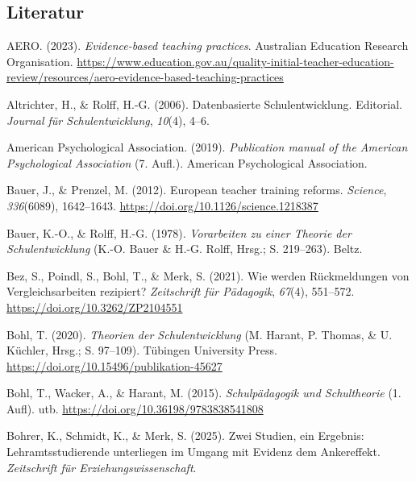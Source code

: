 \documentclass[
  jou,
  floatsintext,
  longtable,
  nolmodern,
  notxfonts,
  notimes,
  colorlinks=true,linkcolor=blue,citecolor=blue,urlcolor=blue]{apa7}
\newlength{\cslhangindent}
\newenvironment{CSLReferences}[2] %
 {\begin{list}{}{%
  \setlength{\itemindent}{0pt}
  \setlength{\leftmargin}{0pt}
  \setlength{\parsep}{0pt}
  \ifodd #1
   \setlength{\leftmargin}{\cslhangindent}
   \setlength{\itemindent}{-1\cslhangindent}
  \fi
  \setlength{\itemsep}{#2\baselineskip}}}
 {\end{list}}
\begin{document}
\subsection{Literatur}\label{literatur}

\label{refs}
\begin{CSLReferences}{1}{0}
AERO. (2023). \emph{Evidence-based teaching practices}. Australian
Education Research Organisation.
\url{https://www.education.gov.au/quality-initial-teacher-education-review/resources/aero-evidence-based-teaching-practices}

Altrichter, H., \& Rolff, H.-G. (2006). Datenbasierte Schulentwicklung.
Editorial. \emph{Journal für Schulentwicklung}, \emph{10}(4), 4--6.

American Psychological Association. (2019). \emph{Publication manual of
the American Psychological Association} (7. Aufl.). American
Psychological Association.

Bauer, J., \& Prenzel, M. (2012). European teacher training reforms.
\emph{Science}, \emph{336}(6089), 1642--1643.
\url{https://doi.org/10.1126/science.1218387}

Bauer, K.-O., \& Rolff, H.-G. (1978). \emph{Vorarbeiten zu einer Theorie
der Schulentwicklung} (K.-O. Bauer \& H.-G. Rolff, Hrsg.; S. 219--263).
Beltz.

Bez, S., Poindl, S., Bohl, T., \& Merk, S. (2021). Wie werden
Rückmeldungen von Vergleichsarbeiten rezipiert? \emph{Zeitschrift für
Pädagogik}, \emph{67}(4), 551--572.
\url{https://doi.org/10.3262/ZP2104551}

Bohl, T. (2020). \emph{Theorien der Schulentwicklung} (M. Harant, P.
Thomas, \& U. Küchler, Hrsg.; S. 97--109). Tübingen University Press.
\url{https://doi.org/10.15496/publikation-45627}

Bohl, T., Wacker, A., \& Harant, M. (2015). \emph{Schulpädagogik und
Schultheorie} (1. Aufl). utb.
\url{https://doi.org/10.36198/9783838541808}

Bohrer, K., Schmidt, K., \& Merk, S. (2025). Zwei Studien, ein Ergebnis:
Lehramtsstudierende unterliegen im Umgang mit Evidenz dem Ankereffekt.
\emph{Zeitschrift für Erziehungswissenschaft}.


\end{CSLReferences}
\end{document}
